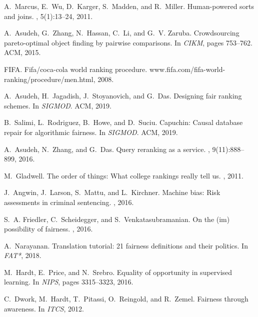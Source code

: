 \documentclass[11pt]{article}
\begin{document}
\begin{thebibliography}{10}
\itemsep=1pt
\begin{small}
\vspace{-3mm}

A.~Marcus, E.~Wu, D.~Karger, S.~Madden, and R.~Miller.
\newblock Human-powered sorts and joins.
, 5(1):13--24, 2011.

A.~Asudeh, G.~Zhang, N.~Hassan, C.~Li, and G.~V. Zaruba.
\newblock Crowdsourcing pareto-optimal object finding by pairwise comparisons.
\newblock In {\em CIKM}, pages 753--762. ACM, 2015.

FIFA.
\newblock Fifa/coca-cola world ranking procedure.
\newblock www.fifa.com/fifa-world-ranking/procedure/men.html, 2008.

A.~Asudeh, H.~Jagadish, J.~Stoyanovich, and G.~Das.
\newblock Designing fair ranking schemes.
\newblock In {\em SIGMOD}. ACM, 2019.

B.~Salimi, L.~Rodriguez, B.~Howe, and D.~Suciu.
\newblock Capuchin: Causal database repair for algorithmic fairness.
\newblock In {\em SIGMOD}. ACM, 2019.

A.~Asudeh, N.~Zhang, and G.~Das.
\newblock Query reranking as a service.
, 9(11):888--899, 2016.

M.~Gladwell.
\newblock The order of things: What college rankings really tell us.
, 2011.

J.~Angwin, J.~Larson, S.~Mattu, and L.~Kirchner.
\newblock Machine bias: Risk assessments in criminal sentencing.
, 2016.

S.~A. Friedler, C.~Scheidegger, and S.~Venkatasubramanian.
\newblock On the (im) possibility of fairness.
, 2016.

A.~Narayanan.
\newblock Translation tutorial: 21 fairness definitions and their politics.
\newblock In {\em FAT*}, 2018.

M.~Hardt, E.~Price, and N.~Srebro.
\newblock Equality of opportunity in supervised learning.
\newblock In {\em NIPS}, pages 3315--3323, 2016.

C.~Dwork, M.~Hardt, T.~Pitassi, O.~Reingold, and R.~Zemel.
\newblock Fairness through awareness.
\newblock In {\em ITCS}, 2012.


\end{small}
\end{thebibliography}
\end{document}
